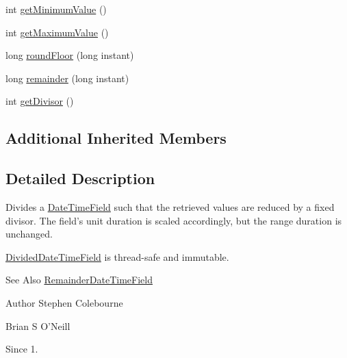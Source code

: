 \begin{DoxyCompactItemize}
\item 
int \hyperlink{classorg_1_1joda_1_1time_1_1field_1_1_divided_date_time_field_a2730033489510a1c2f542eec89a8ffea}{get\-Minimum\-Value} ()
\item 
int \hyperlink{classorg_1_1joda_1_1time_1_1field_1_1_divided_date_time_field_a42cf5677e5c74e8edb59ad79d4ec8a2f}{get\-Maximum\-Value} ()
\item 
long \hyperlink{classorg_1_1joda_1_1time_1_1field_1_1_divided_date_time_field_aa6797087fc15f87da79e732a664699e6}{round\-Floor} (long instant)
\item 
long \hyperlink{classorg_1_1joda_1_1time_1_1field_1_1_divided_date_time_field_a2639fc23317aae40cf80374dfc6001c5}{remainder} (long instant)
\item 
int \hyperlink{classorg_1_1joda_1_1time_1_1field_1_1_divided_date_time_field_a810840620692a08991128d3f46d580cb}{get\-Divisor} ()
\end{DoxyCompactItemize}
\subsection*{Additional Inherited Members}


\subsection{Detailed Description}
Divides a \hyperlink{classorg_1_1joda_1_1time_1_1_date_time_field}{Date\-Time\-Field} such that the retrieved values are reduced by a fixed divisor. The field's unit duration is scaled accordingly, but the range duration is unchanged. 

\hyperlink{classorg_1_1joda_1_1time_1_1field_1_1_divided_date_time_field}{Divided\-Date\-Time\-Field} is thread-\/safe and immutable.

\begin{DoxySeeAlso}{See Also}
\hyperlink{classorg_1_1joda_1_1time_1_1field_1_1_remainder_date_time_field}{Remainder\-Date\-Time\-Field}
\end{DoxySeeAlso}
\begin{DoxyAuthor}{Author}
Stephen Colebourne 

Brian S O'Neill 
\end{DoxyAuthor}
\begin{DoxySince}{Since}
1. 
\end{DoxySince}


